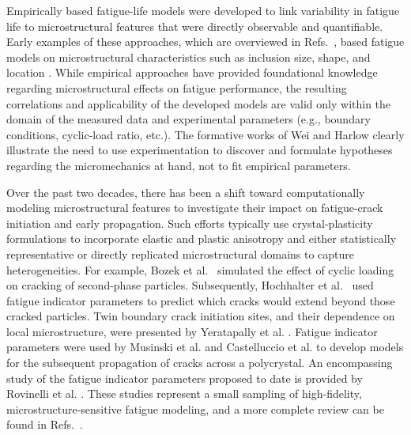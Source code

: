 Empirically based fatigue-life models were developed to link variability in fatigue life to microstructural features that were directly observable and quantifiable. Early examples of these approaches, which are overviewed in Refs.~\cite{Murakami_1994, Fatemi_1998, Hussain_1997}, based fatigue models on microstructural characteristics such as inclusion size, shape, and location \cite{Laz_1998, Brockenbrough_1994, Przystupa_1997}. While empirical approaches have provided foundational knowledge regarding microstructural effects on fatigue performance, the resulting correlations and applicability of the developed models are valid only within the domain of the measured data and experimental parameters (e.g., boundary conditions, cyclic-load ratio, etc.). The formative works of Wei and Harlow \cite{Wei_2005, Harlow_2009} clearly illustrate the need to use experimentation to discover and formulate hypotheses regarding the micromechanics at hand, not to fit empirical parameters.  

Over the past two decades, there has been a shift toward computationally modeling microstructural features to investigate their impact on fatigue-crack initiation and early propagation. Such efforts typically use crystal-plasticity formulations to incorporate elastic and plastic anisotropy and either statistically representative or directly replicated microstructural domains to capture heterogeneities. For example, Bozek et al.~\cite{Bozek_2008} simulated the effect of cyclic loading on cracking of second-phase particles. Subsequently, Hochhalter et al.~\cite{hochhalter2010geometric, Hochhalter_2011} used fatigue indicator parameters to predict which cracks would extend beyond those cracked particles.  Twin boundary crack initiation sites, and their dependence on local microstructure, were presented by Yeratapally et al. \cite{Yeratapally_2016}.  Fatigue indicator parameters were used by Musinski et al. \cite{Musinski_2016} and Castelluccio et al. \cite{Castelluccio_2016} to develop models for the subsequent propagation of cracks across a polycrystal. An encompassing study of the fatigue indicator parameters proposed to date is provided by Rovinelli et al. \cite{Rovinelli_2017}. These studies represent a small sampling of high-fidelity, microstructure-sensitive fatigue modeling, and a more complete review can be found in Refs.~\cite{Sangid_2013, McDowell_2010, Castelluccio_2014, Christ_2014}.  

